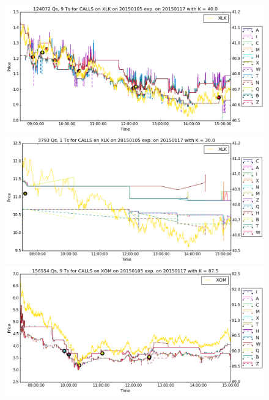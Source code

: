 \documentclass[a4paper,12pt]{article}
\theoremstyle{plain}
\theoremstyle{definition}
\begin{document}
\vspace*{\fill}
\begin{figure}[H]
\begin{center}
 \includegraphics[width=\linewidth]{figures/contract_pics/XLK_top.png}
 \endminipage
 \hspace{3mm}
 \includegraphics[width=\linewidth]{figures/contract_pics/XLK_middle.png}
 \endminipage\\
  \vspace{5mm}
 \includegraphics[width=\linewidth]{figures/contract_pics/XOM_top.png}
 \endminipage
 \hspace{3mm}

\end{center}
\end{figure}
\end{document}
